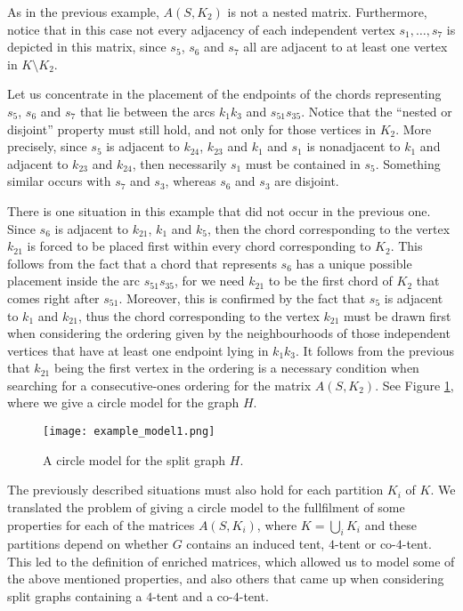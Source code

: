 \documentclass[12pt]{book}
\theoremstyle{plain}
\theoremstyle{remark}
\begin{document}
 
As in the previous example, $A(S,K_2)$ is not a nested matrix. Furthermore, notice that in this case not every adjacency of each independent vertex $s_1, \ldots, s_7$ is depicted in this matrix, since $s_5$, $s_6$ and $s_7$ all are adjacent to at least one vertex in $K \setminus K_2$. 

Let us concentrate in the placement of the endpoints of the chords representing $s_5$, $s_6$ and $s_7$ that lie between the arcs $k_1 k_3$ and $s_{51} s_{35}$. Notice that the ``nested or disjoint'' property must still hold, and not only for those vertices in $K_2$. More precisely, since $s_5$ is adjacent to $k_{24}$, $k_{23}$ and $k_1$ and $s_1$ is nonadjacent to $k_1$ and adjacent to $k_{23}$ and $k_{24}$, then necessarily $s_1$ must be contained in $s_5$. Something similar occurs with $s_7$ and $s_3$, whereas $s_6$ and $s_3$ are disjoint. 

There is one situation in this example that did not occur in the previous one. Since $s_6$ is adjacent to $k_{21}$, $k_1$ and $k_5$, then the chord corresponding to the vertex $k_{21}$ is forced to be placed first within every chord corresponding to $K_2$. This follows from the fact that a chord that represents $s_6$ has a unique possible placement inside the arc $s_{51} s_{35}$, for we need $k_{21}$ to be the first chord of $K_2$ that comes right after $s_{51}$. Moreover, this is confirmed by the fact that $s_5$ is adjacent to $k_1$ and $k_{21}$, thus the chord corresponding to the vertex $k_{21}$ must be drawn first when considering the ordering given by the neighbourhoods of those independent vertices that have at least one endpoint lying in $k_1 k_3$. It follows from the previous that $k_{21}$ being the first vertex in the ordering is a necessary condition when searching for a consecutive-ones ordering for the matrix $A(S,K_2)$. See Figure \ref{fig:example_model1}, where we give a circle model for the graph $H$.

\begin{figure}[h!] 	\centering
	\texttt{[image: example\_model1.png]}
	\caption{A circle model for the split graph $H$.}
	\label{fig:example_model1}
\end{figure}

The previously described situations must also hold for each partition $K_i$ of $K$. We translated the problem of giving a circle model to the fullfilment of some properties for each of the matrices $A(S,K_i)$, where $K= \bigcup_{i} K_i$ and these partitions depend on whether $G$ contains an induced tent, $4$-tent or co-$4$-tent.
This led to the definition of enriched matrices, which allowed us to model some of the above mentioned properties, and also others that came up when considering split graphs containing a $4$-tent and a co-$4$-tent. 
\end{document}
